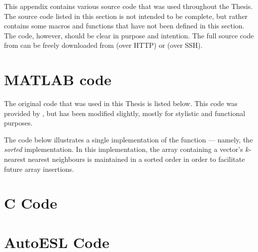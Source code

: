 This appendix contains various source code that was used throughout the Thesis.
The source code listed in this section is not intended to be complete, but
rather contains some macros and functions that have not been defined in this
section. The code, however, should be clear in purpose and intention. The full
source code from can be freely downloaded from \gitRepoHTTP{} (over HTTP) or
\gitRepoSSH{} (over SSH).

\section{MATLAB code}
\label{sourceCode:matlab}
The original  code that was used in this Thesis is listed
below. This code was provided by \citeauthor{Khoa:2012}, but has been modified
slightly, mostly for stylistic and functional purposes.

The code below illustrates a single implementation of the
 function --- namely, the \emph{sorted}
implementation. In this implementation, the array containing a vector's
$k$-nearest nearest neighbours is maintained in a sorted order in order to
facilitate future array insertions.



\section{C Code}
\label{sourceCode:c}


\section{AutoESL Code}
\label{sourceCode:autoesl}
